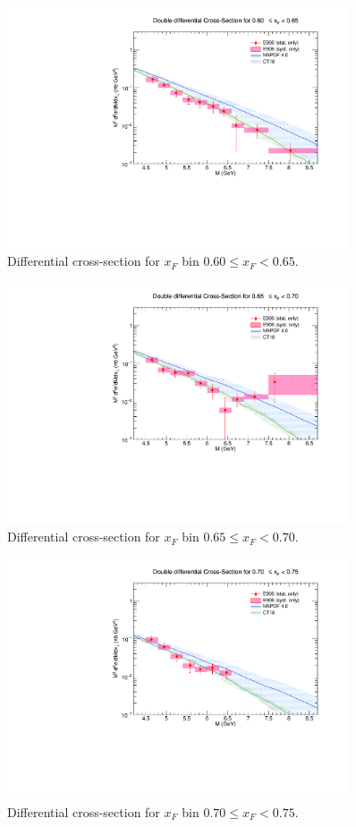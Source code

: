 \documentclass[11pt]{article}
\begin{document}
\clearpage
\begin{figure}[p]
\centering
\includegraphics[width=0.9\textwidth]{./XSecPlots/LH2_12_roofit.pdf}
\caption{Differential cross-section for $x_F$ bin $0.60 \leq x_F < 0.65$.}
\end{figure}
\clearpage
\begin{figure}[p]
\centering
\includegraphics[width=0.9\textwidth]{./XSecPlots/LH2_13_roofit.pdf}
\caption{Differential cross-section for $x_F$ bin $0.65 \leq x_F < 0.70$.}
\end{figure}
\clearpage
\begin{figure}[p]
\centering
\includegraphics[width=0.9\textwidth]{./XSecPlots/LH2_14_roofit.pdf}
\caption{Differential cross-section for $x_F$ bin $0.70 \leq x_F < 0.75$.}
\end{figure}
\end{document}
